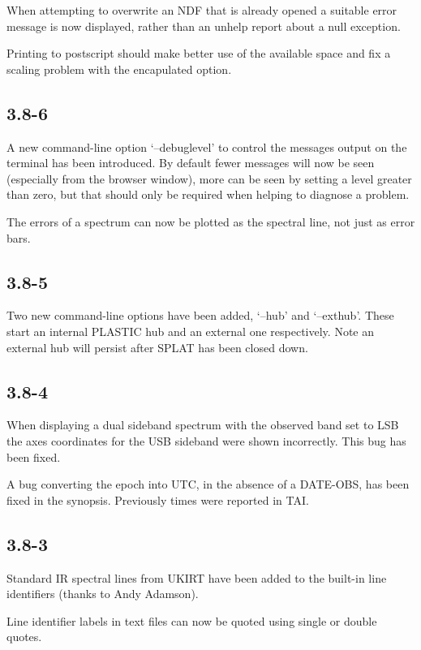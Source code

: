 \documentclass[twoside,11pt]{article}
\renewcommand{\_}{\texttt{\symbol{95}}}
\begin{document}
When attempting to overwrite an NDF that is already opened a suitable
error message is now displayed, rather than an unhelp report about
a null exception.

Printing to postscript should make better use of the available space
and fix a scaling problem with the encapulated option.

\subsection{3.8-6}

A new command-line option `--debuglevel' to control the messages output on the
terminal has been introduced. By default fewer messages will now be seen
(especially from the browser window), more can be seen by setting a level
greater than zero, but that should only be required when helping to diagnose a
problem.

The errors of a spectrum can now be plotted as the spectral line, not just as
error bars.

\subsection{3.8-5}

Two new command-line options have been added, `--hub' and `--exthub'.
These start an internal PLASTIC hub and an external one respectively.
Note an external hub will persist after SPLAT has been closed down.

\subsection{3.8-4}

When displaying a dual sideband spectrum with the observed band set to LSB the
axes coordinates for the USB sideband were shown incorrectly. This bug has
been fixed.

A bug converting the epoch into UTC, in the absence of a DATE-OBS, has been
fixed in the synopsis. Previously times were reported in TAI.

\subsection{3.8-3}

Standard IR spectral lines from UKIRT have been added to the built-in
line identifiers (thanks to Andy Adamson).

Line identifier labels in text files can now be quoted using single
or double quotes.
\end{document}
